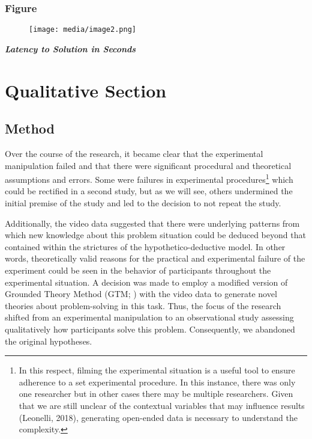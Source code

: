 \documentclass{article}
\begin{document}
\subsubsection{}

\subsubsection{Figure }


\begin{figure}

  \texttt{[image: media/image2.png]}
\caption{}
\label{}


\end{figure}
\emph{\textbf{Latency to Solution in Seconds}}





\section{Qualitative Section}

\subsection{Method}

Over the course of the research, it became clear that the experimental manipulation failed and that there were significant procedural and theoretical assumptions and errors. Some were failures in experimental procedures\footnote{In this respect, filming the experimental situation is a useful tool to ensure adherence to a set experimental procedure. In this instance, there was only one researcher but in other cases there may be multiple researchers. Given that we are still unclear of the contextual variables that may influence results (Leonelli, 2018), generating open-ended data is necessary to understand the complexity. } which could be rectified in a second study, but as we will see, others undermined the initial premise of the study and led to the decision to not repeat the study. 

Additionally, the video data suggested that there were underlying patterns from which new knowledge about this problem situation could be deduced beyond that contained within the strictures of the hypothetico-deductive model. In other words, theoretically valid reasons for the practical and experimental failure of the experiment could be seen in the behavior of participants throughout the experimental situation. A decision was made to employ a modified version of Grounded Theory Method (GTM; \parencite{Glaser1967}) with the video data to generate novel theories about problem-solving in this task. Thus, the focus of the research shifted from an experimental manipulation to an observational study assessing qualitatively how participants solve this problem. Consequently, we abandoned the original hypotheses. 
\end{document}
